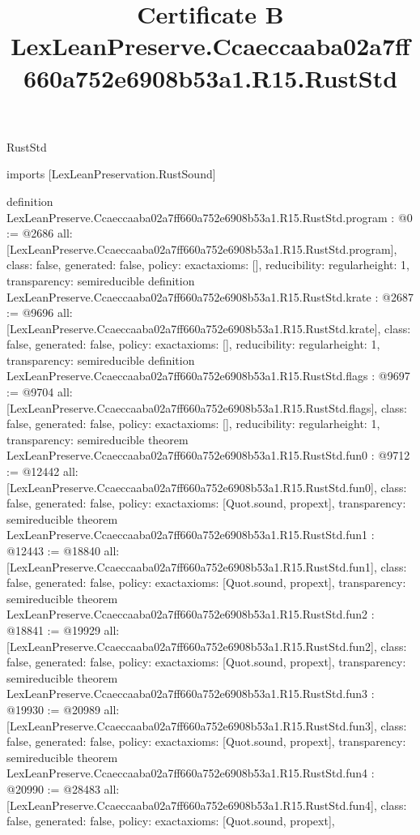 \begin{lexlean}{RustStd}
\title{Certificate B LexLeanPreserve.Ccaeccaaba02a7ff660a752e6908b53a1.R15.RustStd}
\begin{coremodule}
imports [LexLeanPreservation.RustSound]

definition LexLeanPreserve.Ccaeccaaba02a7ff660a752e6908b53a1.R15.RustStd.program : @0 := @2686 {
  all: [LexLeanPreserve.Ccaeccaaba02a7ff660a752e6908b53a1.R15.RustStd.program],
  class: false,
  generated: false,
  policy: exact{axioms: []},
  reducibility: regular{height: 1},
  transparency: semireducible
}
definition LexLeanPreserve.Ccaeccaaba02a7ff660a752e6908b53a1.R15.RustStd.krate : @2687 := @9696 {
  all: [LexLeanPreserve.Ccaeccaaba02a7ff660a752e6908b53a1.R15.RustStd.krate],
  class: false,
  generated: false,
  policy: exact{axioms: []},
  reducibility: regular{height: 1},
  transparency: semireducible
}
definition LexLeanPreserve.Ccaeccaaba02a7ff660a752e6908b53a1.R15.RustStd.flags : @9697 := @9704 {
  all: [LexLeanPreserve.Ccaeccaaba02a7ff660a752e6908b53a1.R15.RustStd.flags],
  class: false,
  generated: false,
  policy: exact{axioms: []},
  reducibility: regular{height: 1},
  transparency: semireducible
}
theorem LexLeanPreserve.Ccaeccaaba02a7ff660a752e6908b53a1.R15.RustStd.fun0 : @9712 := @12442 {
  all: [LexLeanPreserve.Ccaeccaaba02a7ff660a752e6908b53a1.R15.RustStd.fun0],
  class: false,
  generated: false,
  policy: exact{axioms: [Quot.sound, propext]},
  transparency: semireducible
}
theorem LexLeanPreserve.Ccaeccaaba02a7ff660a752e6908b53a1.R15.RustStd.fun1 : @12443 := @18840 {
  all: [LexLeanPreserve.Ccaeccaaba02a7ff660a752e6908b53a1.R15.RustStd.fun1],
  class: false,
  generated: false,
  policy: exact{axioms: [Quot.sound, propext]},
  transparency: semireducible
}
theorem LexLeanPreserve.Ccaeccaaba02a7ff660a752e6908b53a1.R15.RustStd.fun2 : @18841 := @19929 {
  all: [LexLeanPreserve.Ccaeccaaba02a7ff660a752e6908b53a1.R15.RustStd.fun2],
  class: false,
  generated: false,
  policy: exact{axioms: [Quot.sound, propext]},
  transparency: semireducible
}
theorem LexLeanPreserve.Ccaeccaaba02a7ff660a752e6908b53a1.R15.RustStd.fun3 : @19930 := @20989 {
  all: [LexLeanPreserve.Ccaeccaaba02a7ff660a752e6908b53a1.R15.RustStd.fun3],
  class: false,
  generated: false,
  policy: exact{axioms: [Quot.sound, propext]},
  transparency: semireducible
}
theorem LexLeanPreserve.Ccaeccaaba02a7ff660a752e6908b53a1.R15.RustStd.fun4 : @20990 := @28483 {
  all: [LexLeanPreserve.Ccaeccaaba02a7ff660a752e6908b53a1.R15.RustStd.fun4],
  class: false,
  generated: false,
  policy: exact{axioms: [Quot.sound, propext]},
}
\end{coremodule}
\end{lexlean}
